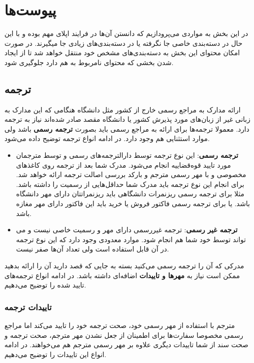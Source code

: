 \chapter{پیوست‌ها}
\label{ch:appendix}

در این بخش به مواردی می‌پرودازیم که دانستن آن‌ها در فرایند اپلای مهم بوده و با این حال در دسته‌بندی خاصی جا نگرفته یا در دسته‌بندی‌های زیادی
جا میگیرند. در صورت امکان محتوای این بخش به دسته‌بندی‌های مشخص خود منتقل خواهد شد تا از ایجاد شدن بخشی که محتوای نامربوط به هم دارد جلوگیری شود. 


\section{ترجمه}\label{sec:translation}
ارائه مدارک به مراجع رسمی خارج از کشور مثل دانشگاه هنگامی که این مدارک به زبانی غیر از زبان‌های مورد پذیرش 
کشور یا دانشگاه مقصد صادر شده‌اند نیاز به ترجمه دارد. معمولا ترجمه‌ها برای ارائه به مراجع رسمی باید بصورت \textbf{ترجمه رسمی} باشد
ولی موارد استثنایی هم وجود دارد. در ادامه انواع ترجمه توضیح داده می‌شود. 

\begin{itemize}
    \item \textbf{ترجمه رسمی}: این نوع ترجمه توسط دارالترجمه‌های رسمی و توسط مترجمان مورد تایید قوه‌قضاییه انجام می‌شود. 
    مدرک شما بعد از ترجمه روی کاغذ‌های مخصوصی و با مهر رسمی مترجم و بارکد بررسی اصالت ترجمه ارائه خواهد شد. برای انجام این نوع ترجمه باید
    مدرک شما حداقل‌هایی از رسمیت را داشته باشد. مثلا برای ترجمه رسمی ریزنمرات دانشگاهی باید ریزنمراتتان دارای مهر دانشگاه باشد. یا برای
    ترجمه رسمی فاکتور فروش یا خرید باید این فاکتور دارای مهر مغازه باشد.  

    \item \textbf{ترجمه غیر رسمی}: ترجمه غیررسمی دارای مهر و رسمیت خاصی نیست و می تواند توسط خود شما هم انجام شود. موارد معدودی
    وجود دارد که این نوع ترجمه در آن قابل استفاده است ولی تعداد آن‌ها صفر نیست.
\end{itemize}

مدرکی که آن را ترجمه رسمی می‌کنید بسته به جایی که قصد دارید آن را ارائه بدهید ممکن است نیاز به \textbf{مهرها و تاییدات} اضافه‌ای 
داشته باشد. در ادامه انواع ترجمه‌های تایید شده را توضیح می‌دهیم. 

\subsection{تاییدات ترجمه}\label{ssec:legalization}
مترجم با استفاده از مهر رسمی خود، صحت ترجمه خود را تایید می‌کند اما مراجع رسمی مخصوصا سفارت‌ها 
برای اطمینان از جعل نشدن مهر مترجم، صحت ترجمه و صحت سند از شما تاییدات دیگری علاوه بر مهر رسمی مترجم هم می‌خواهند. در ادامه انواع این تاییدات را 
توضیح می‌دهیم. 

